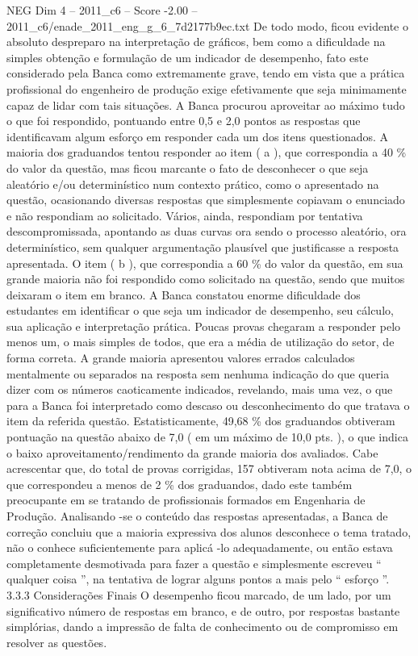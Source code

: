 \begin{textsample}{NEG Dim 4 – 2011\_c6 – Score -2.00 – 2011\_c6/enade\_2011\_eng\_g\_6\_7d2177b9ec.txt}
De todo modo, ficou evidente o absoluto despreparo na interpretação de gráficos, bem como a dificuldade na simples obtenção e formulação de um indicador de desempenho, fato este considerado pela Banca como extremamente grave, tendo em vista que a prática profissional do engenheiro de produção exige efetivamente que seja minimamente capaz de lidar com tais situações.
A Banca procurou aproveitar ao máximo tudo o que foi respondido, pontuando entre 0,5 e 2,0 pontos as respostas que identificavam algum esforço em responder cada um dos itens questionados.
A maioria dos graduandos tentou responder ao item ( a ), que correspondia a 40 \% do valor da questão, mas ficou marcante o fato de desconhecer o que seja aleatório e/ou determinístico num contexto prático, como o apresentado na questão, ocasionando diversas respostas que simplesmente copiavam o enunciado e não respondiam ao solicitado.
Vários, ainda, respondiam por tentativa descompromissada, apontando as duas curvas ora sendo o processo aleatório, ora determinístico, sem qualquer argumentação plausível que justificasse a resposta apresentada.
O item ( b ), que correspondia a 60 \% do valor da questão, em sua grande maioria não foi respondido como solicitado na questão, sendo que muitos deixaram o item em branco.
A Banca constatou enorme dificuldade dos estudantes em identificar o que seja um indicador de desempenho, seu cálculo, sua aplicação e interpretação prática.
Poucas provas chegaram a responder pelo menos um, o mais simples de todos, que era a média de utilização do setor, de forma correta.
A grande maioria apresentou valores errados calculados mentalmente ou separados na resposta sem nenhuma indicação do que queria dizer com os números caoticamente indicados, revelando, mais uma vez, o que para a Banca foi interpretado como descaso ou desconhecimento do que tratava o item da referida questão.
Estatisticamente, 49,68 \% dos graduandos obtiveram pontuação na questão abaixo de 7,0 ( em um máximo de 10,0 pts. ), o que indica o baixo aproveitamento/rendimento da grande maioria dos avaliados.
Cabe acrescentar que, do total de provas corrigidas, 157 obtiveram nota acima de 7,0, o que correspondeu a menos de 2 \% dos graduandos, dado este também preocupante em se tratando de profissionais formados em Engenharia de Produção.
Analisando -se o conteúdo das respostas apresentadas, a Banca de correção concluiu que a maioria expressiva dos alunos desconhece o tema tratado, não o conhece suficientemente para aplicá -lo adequadamente, ou então estava completamente desmotivada para fazer a questão e simplesmente escreveu “ qualquer coisa ”, na tentativa de lograr alguns pontos a mais pelo “ esforço ”. 3.3.3 Considerações Finais O desempenho ficou marcado, de um lado, por um significativo número de respostas em branco, e de outro, por respostas bastante simplórias, dando a impressão de falta de conhecimento ou de compromisso em resolver as questões.

\end{textsample}
